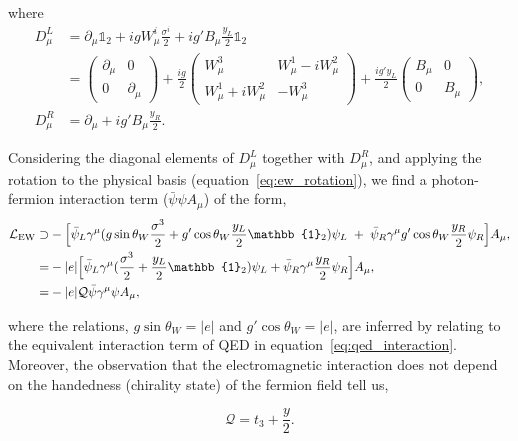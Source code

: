 \noindent
where
\begin{equation}
\begin{split}
    D^L_\mu &= \partial_\mu \mathbb{1}_2 + igW^i_\mu \frac{\sigma^i}{2} + ig'B_\mu \frac{y_L}{2} \mathbb{1}_2 
    \\
    &= \begin{pmatrix}
    \partial_\mu & 0 \\
    0 & \partial_\mu
    \end{pmatrix} + \frac{ig}{2}\begin{pmatrix}
    W^3_\mu & W^1_\mu-iW^2_\mu \\
    W^1_\mu+iW^2_\mu & -W^3_\mu
    \end{pmatrix} + \frac{ig'y_L}{2}\begin{pmatrix}
    B_\mu & 0 \\
    0 & B_\mu
    \end{pmatrix},
    \\
    D^R_\mu &= \partial_\mu + ig'B_\mu \frac{y_R}{2}.
\end{split}
\end{equation}

\noindent
Considering the diagonal elements of $D^L_\mu$ together with $D^R_\mu$, and applying the rotation to the physical basis (equation~\ref{eq:ew_rotation}), we find a photon-fermion interaction term ($\bar{\psi}\psi A_\mu$) of the form,
\begin{equation}
\begin{split}
    \mathcal{L}_{\rm{EW}} \supset &-\Big[ \bar{\psi}_L \gamma^\mu(g\sin{\theta_W} \frac{\sigma^3}{2} + g'\cos{\theta_W} \frac{y_L}{2} \mathbb{1}_2)\psi_L \; + \; \bar{\psi}_R\gamma^\mu g'\cos{\theta_W}\frac{y_R}{2}\psi_R \Big]A_\mu,
    \\
    = &-|e|\Big[ \bar{\psi}_L \gamma^\mu (\frac{\sigma^3}{2}+\frac{y_L}{2} \mathbb{1}_2)\psi_L + \bar{\psi}_R\gamma^\mu \frac{y_R}{2}\psi_R \Big]A_\mu,
    \\
    = & - |e|\mathcal{Q} \bar{\psi} \gamma^\mu \psi A_\mu,
\end{split}
\end{equation}

\noindent
where the relations, $g\sin{\theta_W}=|e|$ and $g'\cos{\theta_W}=|e|$, are inferred by relating to the equivalent interaction term of QED in equation~\ref{eq:qed_interaction}. Moreover, the observation that the electromagnetic interaction does not depend on the handedness (chirality state) of the fermion field tell us,

\begin{equation}\label{eq:ew_unification}
    \mathcal{Q} = t_3 + \frac{y}{2}.
\end{equation}

